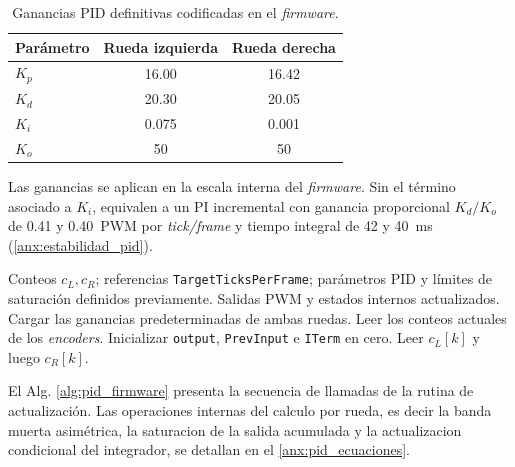 \begin{table}[htbp]
\centering
\caption{Ganancias PID definitivas codificadas en el \textit{firmware}.}
\label{tab:ganancias_pid}
\small
\begin{tabular}{lcc}
\toprule
\textbf{Parámetro} & \textbf{Rueda izquierda} & \textbf{Rueda derecha} \\
\midrule
$K_p$ & 16.00 & 16.42 \\
$K_d$ & 20.30 & 20.05 \\
$K_i$ & 0.075 & 0.001 \\
$K_o$ & 50 & 50 \\
\bottomrule
\end{tabular}
\vspace{3pt}
\parbox{0.85\linewidth}{\footnotesize Las ganancias se aplican en la escala interna del \textit{firmware}. Sin el término asociado a $K_i$, equivalen a un PI incremental con ganancia proporcional $K_d/K_o$ de 0.41 y 0.40~PWM por \textit{tick/frame} y tiempo integral de 42 y 40~ms (\ref{anx:estabilidad_pid}).}
\end{table}

\begin{algorithm}[htbp]
\caption{Rutinas de reinicio y actualización del PID discreto ejecutadas por el \textit{firmware}.}
\label{alg:pid_firmware}
\begin{algorithmic}[1]
\Require Conteos $c_L,c_R$; referencias \texttt{TargetTicksPerFrame}; parámetros PID y límites de saturación definidos previamente.
\Ensure Salidas PWM y estados internos actualizados.
\State Cargar las ganancias predeterminadas de ambas ruedas.
\State Leer los conteos actuales de los {\itshape encoders\/}.
\State Inicializar \texttt{output}, \texttt{PrevInput} e \texttt{ITerm} en cero.
\EndProcedure
\Statex
{}
\State Leer $c_L[k]$ y luego $c_R[k]$.
\State {}
\EndIf
\State \Return
\EndIf
\State {}
\State {}
\State {}
\EndProcedure
\end{algorithmic}
\end{algorithm}

El Alg. \ref{alg:pid_firmware} presenta la secuencia de llamadas de la rutina de actualización. Las operaciones internas del calculo por rueda, es decir la banda muerta asimétrica, la saturacion de la salida acumulada y la actualizacion condicional del integrador, se detallan en el \ref{anx:pid_ecuaciones}.

